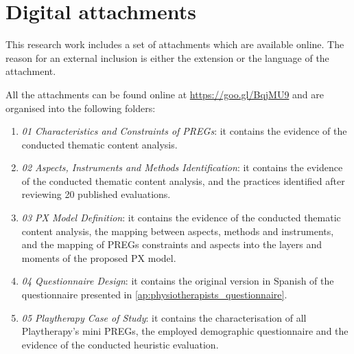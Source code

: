 \chapter{Digital attachments}
\label{ap:digital_attachments}
This research work includes a set of attachments which are available online. The reason for an external inclusion is either the extension or the language of the attachment.

All the attachments can be found online at \url{https://goo.gl/BqjMU9} and are organised into the following folders:

\begin{enumerate}
    \item \emph{01 Characteristics and Constraints of \acp{PREG}}: it contains the evidence of the conducted thematic content analysis.
    \item \emph{02 Aspects, Instruments and Methods Identification}: it contains the evidence of the conducted thematic content analysis, and the practices identified after reviewing 20 published evaluations. 
    \item \emph{03 PX Model Definition}: it contains the evidence of the conducted thematic content analysis, the mapping between aspects, methods and instruments, and the mapping of \acp{PREG} constraints and aspects into the layers and moments of the proposed \ac{PX} model.
    \item \emph{04 Questionnaire Design}: it contains the original version in Spanish of the questionnaire presented in \autoref{ap:physiotherapists_questionnaire}. 
    \item \emph{05 Playtherapy Case of Study}: it contains the characterisation of all Playtherapy's mini \acp{PREG}, the employed demographic questionnaire and the evidence of the conducted heuristic evaluation.
\end{enumerate}